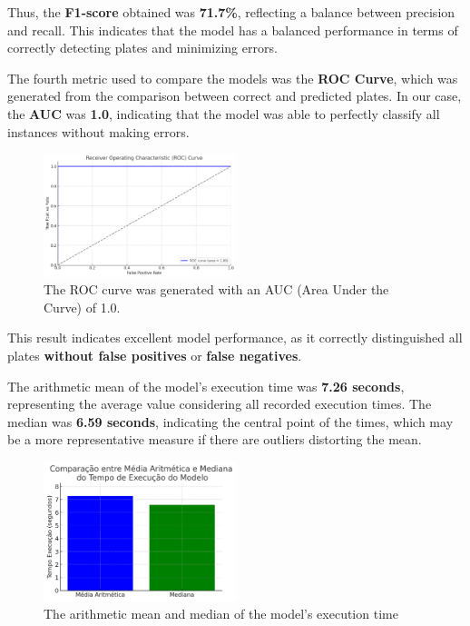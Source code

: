 \documentclass[conference]{IEEEtran}
\begin{document}
    Thus, the \textbf{F1-score} obtained was \textbf{71.7\%}, reflecting a balance between precision and recall. This indicates that the model has a balanced performance in terms of correctly detecting plates and minimizing errors.
    
    The fourth metric used to compare the models was the \textbf{ROC Curve}, which was generated from the comparison between correct and predicted plates. In our case, the \textbf{AUC} was \textbf{1.0}, indicating that the model was able to perfectly classify all instances without making errors.
    
    \begin{figure}[htbp]
        \centerline{\includegraphics[width=0.5\textwidth]{img4.png}}
        \caption{The ROC curve was generated with an AUC (Area Under the Curve) of 1.0.}
        \label{img4}
    \end{figure}
    
    This result indicates excellent model performance, as it correctly distinguished all plates \textbf{without false positives} or \textbf{false negatives}.
    
    The arithmetic mean of the model's execution time was \textbf{7.26 seconds}, representing the average value considering all recorded execution times. The median was \textbf{6.59 seconds}, indicating the central point of the times, which may be a more representative measure if there are outliers distorting the mean.
    
    \begin{figure}[htbp]
        \centerline{\includegraphics[width=0.5\textwidth]{img5.png}}
        \caption{The arithmetic mean and median of the model's execution time}
        \label{img5}
    \end{figure}
    
\end{document}
